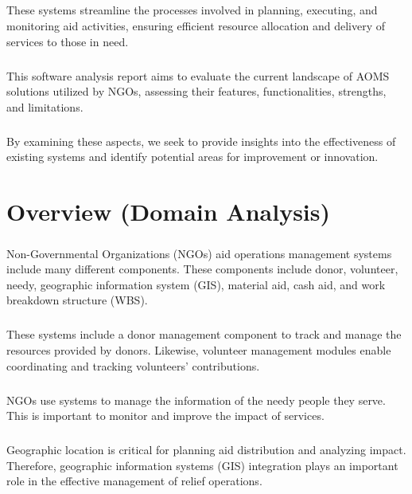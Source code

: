 \documentclass[a4paper,12pt]{report}
\begin{document}
	  	\paragraph{} These systems streamline the processes involved in planning, executing, and monitoring aid activities, ensuring efficient resource allocation and delivery of services to those in need.
   		\paragraph{} This software analysis report aims to evaluate the current landscape of AOMS solutions utilized by NGOs, assessing their features, functionalities, strengths, and limitations. 
     		\paragraph{} By examining these aspects, we seek to provide insights into the effectiveness of existing systems and identify potential areas for improvement or innovation.
    
	\chapter{Overview (Domain Analysis)}
 		\paragraph{} Non-Governmental Organizations (NGOs) aid operations management systems include many different components. These components include donor, volunteer, needy, geographic information system (GIS), material aid, cash aid, and work breakdown structure (WBS).
		\paragraph{} These systems include a donor management component to track and manage the resources provided by donors. Likewise, volunteer management modules enable coordinating and tracking volunteers' contributions.
		\paragraph{} NGOs use systems to manage the information of the needy people they serve. This is important to monitor and improve the impact of services.
		\paragraph{} Geographic location is critical for planning aid distribution and analyzing impact. Therefore, geographic information systems (GIS) integration plays an important role in the effective management of relief operations.
\end{document}
